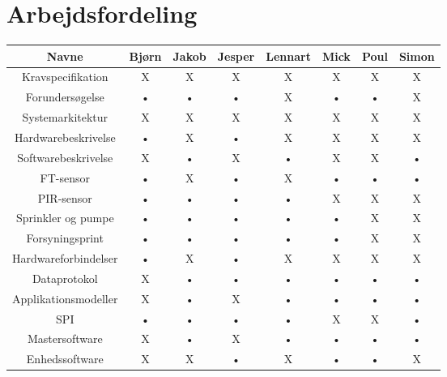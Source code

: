 \chapter*{Arbejdsfordeling}

\begin{tabular}{|c|c|c|c|c|c|c|c|}
\hline 
\textbf{Navne} 		& Bjørn 	& Jakob 	& Jesper 	& Lennart 	& Mick 	& Poul 	& Simon \\ 
\hline 
Kravspecifikation 	& X 		& X 		& X 			& X 			& X 		& X 		& X \\ 
\hline 
Forundersøgelse 		& • 		& • 		& • 			& X 			& • 		& • 		& X \\ 
\hline 
Systemarkitektur 	& X 		& X 		& X 			& X 			& X 		& X 		& X \\ 
\hline 
Hardwarebeskrivelse	& • 		& X 		& • 			& X 			& X 		& X 		& X \\ 
\hline 
Softwarebeskrivelse	& X 		& • 		& X 			& • 			& X 		& X 		& • \\ 
\hline 
FT-sensor			& • 		& X 		& • 			& X 			& • 		& • 		& • \\ 
\hline 
PIR-sensor			& • 		& • 		& • 			& • 			& X 		& X 		& X \\ 
\hline 
Sprinkler og pumpe	& • 		& • 		& • 			& • 			& • 		& X 		& X \\ 
\hline 
Forsyningsprint		& • 		& • 		& • 			& • 			& • 		& X		& X \\ 
\hline 
Hardwareforbindelser	& • 		& X 		& • 			& X 			& X 		& X 		& X \\ 
\hline 
Dataprotokol			& X 		& • 		& • 			& • 			& • 		& • 		& • \\  
\hline 
Applikationsmodeller	& X 		& • 		& X 			& • 			& • 		& • 		& • \\ 
\hline 
SPI				& • 		& • 		& • 			& • 			& X 		& X 		& • \\  
\hline 
Mastersoftware			& X 		& • 		& X 			& • 			& • 		& • 		& • \\  
\hline 
Enhedssoftware			& X 		& X 		& • 			& X 			& • 		& • 		& X \\  
\hline 
\end{tabular} 